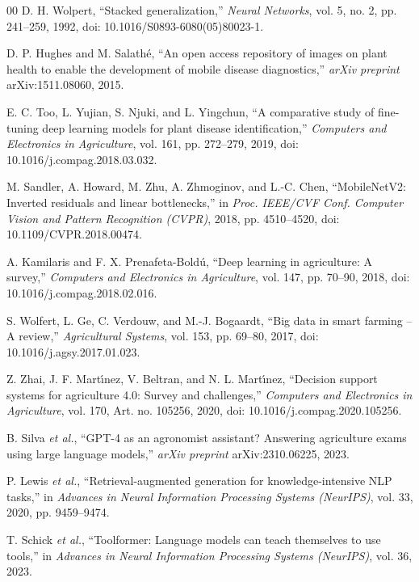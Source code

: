 \documentclass[conference]{IEEEtran}
\begin{document}
\begin{thebibliography}{00}
 D. H. Wolpert, ``Stacked generalization,'' \emph{Neural Networks}, vol. 5, no. 2, pp. 241--259, 1992, doi: 10.1016/S0893-6080(05)80023-1.

 D. P. Hughes and M. Salath\'e, ``An open access repository of images on plant health to enable the development of mobile disease diagnostics,'' \emph{arXiv preprint} arXiv:1511.08060, 2015.

 E. C. Too, L. Yujian, S. Njuki, and L. Yingchun, ``A comparative study of fine-tuning deep learning models for plant disease identification,'' \emph{Computers and Electronics in Agriculture}, vol. 161, pp. 272--279, 2019, doi: 10.1016/j.compag.2018.03.032.

 M. Sandler, A. Howard, M. Zhu, A. Zhmoginov, and L.-C. Chen, ``MobileNetV2: Inverted residuals and linear bottlenecks,'' in \emph{Proc. IEEE/CVF Conf. Computer Vision and Pattern Recognition (CVPR)}, 2018, pp. 4510--4520, doi: 10.1109/CVPR.2018.00474.

 A. Kamilaris and F. X. Prenafeta-Bold\'u, ``Deep learning in agriculture: A survey,'' \emph{Computers and Electronics in Agriculture}, vol. 147, pp. 70--90, 2018, doi: 10.1016/j.compag.2018.02.016.

 S. Wolfert, L. Ge, C. Verdouw, and M.-J. Bogaardt, ``Big data in smart farming -- A review,'' \emph{Agricultural Systems}, vol. 153, pp. 69--80, 2017, doi: 10.1016/j.agsy.2017.01.023.

 Z. Zhai, J. F. Mart\'{\i}nez, V. Beltran, and N. L. Mart\'{\i}nez, ``Decision support systems for agriculture 4.0: Survey and challenges,'' \emph{Computers and Electronics in Agriculture}, vol. 170, Art. no. 105256, 2020, doi: 10.1016/j.compag.2020.105256.

 B. Silva \emph{et al.}, ``GPT-4 as an agronomist assistant? Answering agriculture exams using large language models,'' \emph{arXiv preprint} arXiv:2310.06225, 2023.

 P. Lewis \emph{et al.}, ``Retrieval-augmented generation for knowledge-intensive NLP tasks,'' in \emph{Advances in Neural Information Processing Systems (NeurIPS)}, vol. 33, 2020, pp. 9459--9474.

 T. Schick \emph{et al.}, ``Toolformer: Language models can teach themselves to use tools,'' in \emph{Advances in Neural Information Processing Systems (NeurIPS)}, vol. 36, 2023.


\end{thebibliography}
\end{document}
